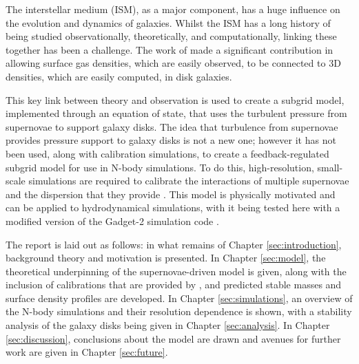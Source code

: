 The interstellar medium (ISM), as a major component, has a huge influence on the evolution and dynamics of galaxies.
Whilst the ISM has a long history of being studied observationally, theoretically, and computationally, linking these together has been a challenge.
The work of \citet{schaye_model-independent_2001} made a significant contribution in allowing surface gas densities, which are easily observed, to be connected to 3D densities, which are easily computed, in disk galaxies.

This key link between theory and observation is used to create a subgrid model, implemented through an equation of state, that uses the turbulent pressure from supernovae to support galaxy disks.
The idea that turbulence from supernovae provides pressure support to galaxy disks is not a new one; \citep{silk_feedback_1997, ostriker_maximally_2011, faucher-giguere_feedback-regulated_2013, martizzi_supernova_2016} however it has not been used, along with calibration simulations, to create a feedback-regulated subgrid model for use in N-body simulations.
To do this, high-resolution, small-scale simulations are required to calibrate the interactions of multiple supernovae and the dispersion that they provide \citep{martizzi_supernova_2015}.
This model is physically motivated and can be applied to hydrodynamical simulations, with it being tested here with a modified version of the Gadget-2 simulation code \citep{springel_cosmological_2003, springel_cosmological_2005}.

The report is laid out as follows: in what remains of Chapter \ref{sec:introduction}, background theory and motivation is presented.
In Chapter \ref{sec:model}, the theoretical underpinning of the supernovae-driven model is given, along with the inclusion of calibrations that are provided by \citet{martizzi_supernova_2015}, and predicted stable masses and surface density profiles are developed.
In Chapter \ref{sec:simulations}, an overview of the N-body simulations and their resolution dependence is shown, with a stability analysis of the galaxy disks being given in Chapter \ref{sec:analysis}.
In Chapter \ref{sec:discussion}, conclusions about the model are drawn and avenues for further work are given in Chapter \ref{sec:future}.

